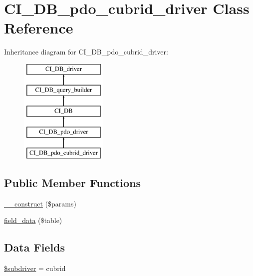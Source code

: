 \hypertarget{class_c_i___d_b__pdo__cubrid__driver}{}\section{C\+I\+\_\+\+D\+B\+\_\+pdo\+\_\+cubrid\+\_\+driver Class Reference}
\label{class_c_i___d_b__pdo__cubrid__driver}
Inheritance diagram for C\+I\+\_\+\+D\+B\+\_\+pdo\+\_\+cubrid\+\_\+driver\+:\begin{figure}[H]
\begin{center}
\leavevmode
\includegraphics[height=5.000000cm]{class_c_i___d_b__pdo__cubrid__driver}
\end{center}
\end{figure}
\subsection*{Public Member Functions}
\begin{DoxyCompactItemize}
\item 
\hyperlink{class_c_i___d_b__pdo__cubrid__driver_a9162320adff1a1a4afd7f2372f753a3e}{\+\_\+\+\_\+construct} (\$params)
\item 
\hyperlink{class_c_i___d_b__pdo__cubrid__driver_a90355121e1ed009e0efdbd544ab56efa}{field\+\_\+data} (\$table)
\end{DoxyCompactItemize}
\subsection*{Data Fields}
\begin{DoxyCompactItemize}
\item 
\hyperlink{class_c_i___d_b__pdo__cubrid__driver_a1322ca756348b11d080cb7a4f590de15}{\$subdriver} = \textquotesingle{}cubrid\textquotesingle{}
\end{DoxyCompactItemize}
